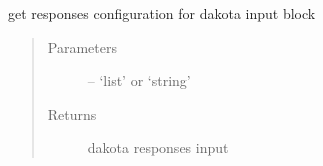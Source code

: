 \documentclass[letterpaper,10pt,english]{sphinxmanual}
\begin{document}
\begin{fulllineitems}
\begin{fulllineitems}
\label{\detokenize{src/apidocs/dakutils:genopt.dakutils.DakotaEnviron.get_config}}
get responses configuration for dakota input block
\begin{quote}\begin{description}
\item[{Parameters}] \leavevmode
{} -- `list' or `string'

\item[{Returns}] \leavevmode
dakota responses input

\end{description}\end{quote}

\end{fulllineitems}


\end{fulllineitems}

\end{document}
